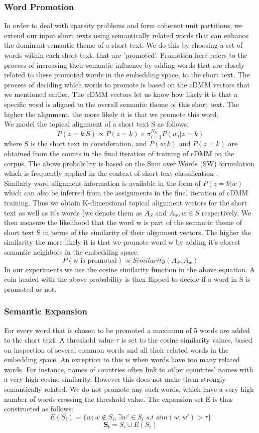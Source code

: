 \documentclass{sig-alternate-05-2015}
\begin{document}
\subsubsection{Word Promotion}
In order to deal with sparsity problems and form coherent unit partitions, we extend our input short texts using semantically related words that can enhance the dominant semantic theme of a short text. We do this by choosing a set of words within each short text, that are 'promoted'. Promotion here refers to the process of increasing their semantic influence by adding words that are closely related to these promoted words in the embedding space, to the short text. The process of deciding which words to promote is based on the cDMM vectors that we mentioned earlier. The cDMM vectors let us know how likely it is that a specific word is aligned to the overall semantic theme of this short text. The higher the alignment, the more likely it is that we promote this word.\\
We model the topical alignment of a short text S as follows:
$$P(z=k|S) \propto P(z=k)\times \pi_{i=1}^{N_S} P(w_{i}|z=k)$$
where S is the short text in consideration, and $P(w|k)$ and $P(z=k)$ are obtained from the counts in the final iteration of training of cDMM on the corpus. The above probability is based on the Sum over Words (SW) formulation which is frequently applied in the context of short text classification \cite{btm}. \\
Similarly word alignment information is available in the form of $P(z=k|w)$ which can also be inferred from the assignments in the final iteration of cDMM training. Thus we obtain K-dimensional topical alignment vectors for the short text as well as it's words (we denote them as $A_{S}$ and $A_{w}, w \in S$ respectively. We then measure the likelihood that the word w is part of the semantic theme of short text S in terms of the similarity of their alignment vectors. The higher the similarity the more likely it is that we promote word w by adding it's closest semantic neighbors in the embedding space.
$$P(\text{w is promoted}) \propto Similarity(A_{S}, A_{w})$$
In our experiments we use the cosine similarity function in the above equation. A coin loaded with the above probability is then flipped to decide if a word in S is promoted or not.
\subsubsection{Semantic Expansion}
For every word that is chosen to be promoted a maximum of 5 words are added to the short text. A threshold value $\tau$ is set to the cosine similarity values, based on inspection of several common words and all their related words in the embedding space. An exception to this is when words have too many related words. For instance, names of countries often link to other countries' names with a very high cosine similarity. However this does not make them strongly semantically related. We do not promote any such words, which have a very high number of words crossing the threshold value. The expansion set E is thus constructed as follows:
$$E(S_{i}) = \{w; w \notin S_{i}, \exists w'\in S_{i}\; s.t \; sim(w, w') > \tau\}$$
$$\mathbf{S_{i}} = S_{i} \cup E(S_{i})$$
\end{document}
